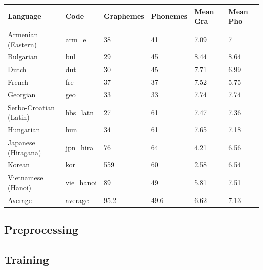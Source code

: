 \documentclass[11pt,a4paper]{article}
\begin{document}
\begin{table}[h]
\centering
\begin{tabular}{llllll}
\toprule
               Language &       Code & Graphemes & Phonemes & Mean Gra & Mean Pho \\
\midrule
     Armenian (Eastern) &      arm\_e &               38 &              41 &              7.09 &                7 \\
              Bulgarian &        bul &               29 &              45 &              8.44 &             8.64 \\
                  Dutch &        dut &               30 &              45 &              7.71 &             6.99 \\
                 French &        fre &               37 &              37 &              7.52 &             5.75 \\
               Georgian &        geo &               33 &              33 &              7.74 &             7.74 \\
 Serbo-Croatian (Latin) &   hbs\_latn &               27 &              61 &              7.47 &             7.36 \\
              Hungarian &        hun &               34 &              61 &              7.65 &             7.18 \\
    Japanese (Hiragana) &   jpn\_hira &               76 &              64 &              4.21 &             6.56 \\
                 Korean &        kor &              559 &              60 &              2.58 &             6.54 \\
     Vietnamese (Hanoi) &  vie\_hanoi &               89 &              49 &              5.81 &             7.51 \\
\midrule
                Average &    average &             95.2 &            49.6 &              6.62 &             7.13 \\
\bottomrule
\end{tabular}
\end{table}

\subsection{Preprocessing}

\subsection{Training}
\end{document}
